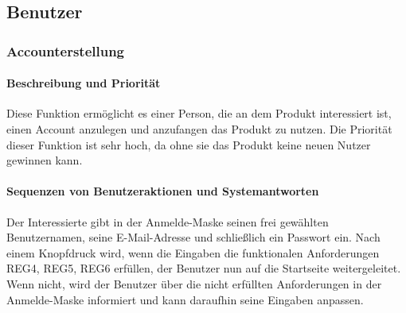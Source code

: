 \subsection{Benutzer}
\subsubsection{Accounterstellung}\label{acc}
\paragraph{Beschreibung und Priorität}
Diese Funktion ermöglicht es einer Person, die an dem Produkt interessiert ist,
einen Account anzulegen und anzufangen das Produkt zu nutzen.
Die Priorität dieser Funktion ist sehr hoch, da ohne sie das Produkt keine neuen Nutzer gewinnen kann.
\paragraph{Sequenzen von Benutzeraktionen und Systemantworten}
Der Interessierte gibt in der Anmelde-Maske seinen frei gewählten Benutzernamen, seine E-Mail-Adresse
und schließlich ein Passwort ein.
Nach einem Knopfdruck wird, wenn die Eingaben die funktionalen Anforderungen REG4, REG5, REG6 erfüllen,
der Benutzer nun auf die Startseite weitergeleitet.
Wenn nicht, wird der Benutzer über die nicht erfüllten Anforderungen in der Anmelde-Maske informiert
und kann daraufhin seine Eingaben anpassen.
